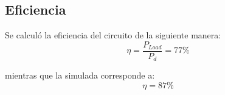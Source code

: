\subsection{Eficiencia}
Se calculó la eficiencia del circuito de la siguiente manera:
\begin{equation}
\eta =\frac{P_{Load}}{P_{d}}= 77\%
\end{equation}

mientras que la simulada corresponde a:
\begin{equation}
\eta = 87\%
\end{equation}
%
